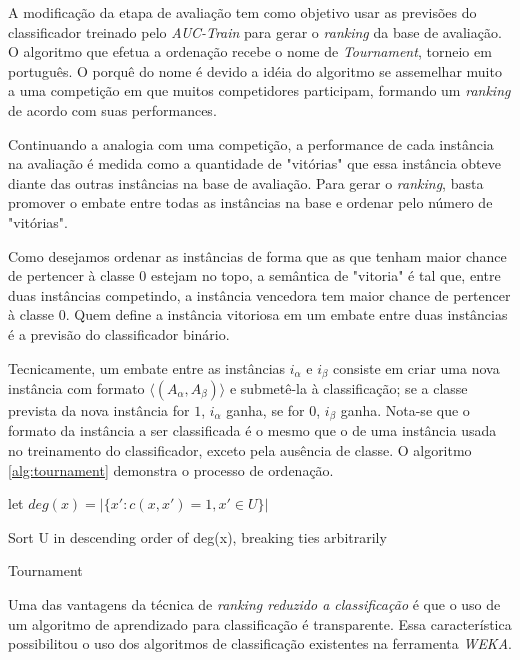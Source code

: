 A modificação da etapa de avaliação tem como objetivo usar as previsões do classificador treinado pelo \emph{AUC-Train} para gerar o \emph{ranking} da base de avaliação. O algoritmo que efetua a ordenação recebe o nome de \emph{Tournament}, torneio em português. O porquê do nome é devido a idéia do algoritmo se assemelhar muito a uma competição em que muitos competidores participam, formando um \emph{ranking} de acordo com suas performances.

Continuando a analogia com uma competição, a performance de cada instância na avaliação é medida como a quantidade de "vitórias" que essa instância obteve diante das outras instâncias na base de avaliação. Para gerar o \emph{ranking}, basta promover o embate entre todas as instâncias na base e ordenar pelo número de "vitórias".

Como desejamos ordenar as instâncias de forma que as que tenham maior chance de pertencer à classe $0$ estejam no topo, a semântica de "vitoria" é tal que, entre duas instâncias competindo, a instância vencedora tem maior chance de pertencer à classe $0$. Quem define a instância vitoriosa em um embate entre duas instâncias é a previsão do classificador binário.

Tecnicamente, um embate entre as instâncias $i_\alpha$ e $i_\beta$ consiste em criar uma nova instância com formato $\langle (A_\alpha, A_\beta)\rangle$ e submetê-la à classificação; se a classe prevista da nova instância for $1$, $i_\alpha$ ganha, se for $0$, $i_\beta$ ganha. Nota-se que o formato da instância a ser classificada é o mesmo que o de uma instância usada no treinamento do classificador, exceto pela ausência de classe. O algoritmo \ref{alg:tournament} demonstra o processo de ordenação.

\begin{algorithm}
    \begin{algorithmic}

            \STATE let $deg(x) = |\{x':c(x, x') = 1, x' \in U\}|$
        \ENDFOR

        \STATE Sort U in descending order of deg(x), breaking ties arbitrarily

        \caption{Tournament}
        \label{alg:tournament}

    \end{algorithmic}
\end{algorithm}

Uma das vantagens da técnica de \emph{ranking reduzido a classificação} é que o uso de um algoritmo de aprendizado para classificação é transparente. Essa característica possibilitou o uso dos algoritmos de classificação existentes na ferramenta \emph{WEKA}.

